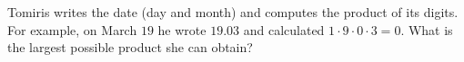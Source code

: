 Tomiris writes the date (day and month) and computes the product of its digits. For example, on March $19$ he wrote $19.03$ and calculated $1\cdot9\cdot0\cdot3=0$. What is the largest possible product she can obtain?
